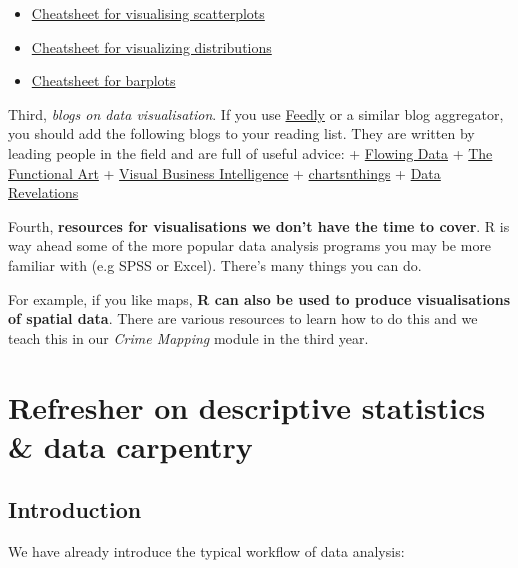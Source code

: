 \documentclass[
]{book}
\providecommand{\tightlist}{%
  \setlength{\itemsep}{0pt}\setlength{\parskip}{0pt}}
\begin{document}
\begin{itemize}
\tightlist
\item
  \href{http://rforpublichealth.blogspot.co.uk/2013/11/ggplot2-cheatsheet-for-scatterplots.html}{Cheatsheet for visualising scatterplots}\\
\item
  \href{http://rforpublichealth.blogspot.co.uk/2014/02/ggplot2-cheatsheet-for-visualizing.html}{Cheatsheet for visualizing distributions}\\
\item
  \href{http://rforpublichealth.blogspot.co.uk/2014_01_01_archive.html}{Cheatsheet for barplots}
\end{itemize}

Third, \emph{blogs on data visualisation}. If you use \href{https://feedly.com/index.html\#discover}{Feedly} or a similar blog aggregator, you should add the following blogs to your reading list. They are written by leading people in the field and are full of useful advice:
+ \href{http://flowingdata.com/}{Flowing Data}
+ \href{http://www.thefunctionalart.com/}{The Functional Art}
+ \href{http://www.perceptualedge.com/blog/}{Visual Business Intelligence}
+ \href{https://kpq.github.io/chartsnthings/}{chartsnthings}
+ \href{http://www.datarevelations.com/category/blog}{Data Revelations}

Fourth, \textbf{resources for visualisations we don't have the time to cover}. R is way ahead some of the more popular data analysis programs you may be more familiar with (e.g SPSS or Excel). There's many things you can do.

For example, if you like maps, \textbf{R can also be used to produce visualisations of spatial data}. There are various resources to learn how to do this and we teach this in our \emph{Crime Mapping} module in the third year.

\hypertarget{refresher-on-descriptive-statistics-data-carpentry}{%
\chapter{Refresher on descriptive statistics \& data carpentry}\label{refresher-on-descriptive-statistics-data-carpentry}}

\hypertarget{introduction-1}{%
\section{Introduction}\label{introduction-1}}

We have already introduce the typical workflow of data analysis:
\end{document}
